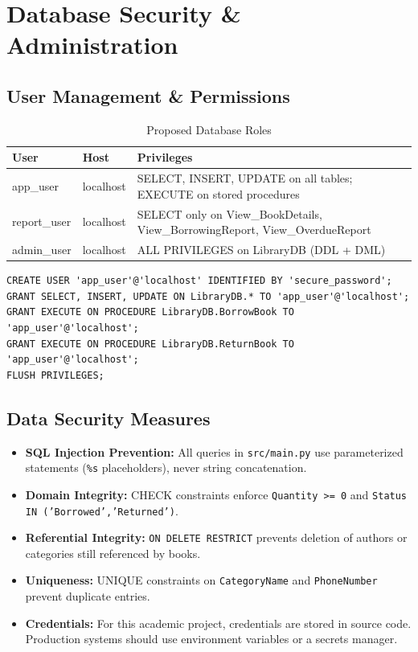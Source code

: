 \documentclass[12pt,a4paper,oneside]{report}
\begin{document}
\chapter{Database Security \& Administration}

\section{User Management \& Permissions}

\begin{table}[H]
  \centering
  \caption{Proposed Database Roles}
  \begin{tabularx}{\linewidth}{L{3cm} L{2.5cm} X}
    \toprule
    \textbf{User} & \textbf{Host} & \textbf{Privileges} \\
    \midrule
    app\_user    & localhost & SELECT, INSERT, UPDATE on all tables;
                               EXECUTE on stored procedures \\
    report\_user & localhost & SELECT only on View\_BookDetails,
                               View\_BorrowingReport, View\_OverdueReport \\
    admin\_user  & localhost & ALL PRIVILEGES on LibraryDB (DDL + DML) \\
    \bottomrule
  \end{tabularx}
\end{table}

\begin{lstlisting}[style=sqlstyle]
CREATE USER 'app_user'@'localhost' IDENTIFIED BY 'secure_password';
GRANT SELECT, INSERT, UPDATE ON LibraryDB.* TO 'app_user'@'localhost';
GRANT EXECUTE ON PROCEDURE LibraryDB.BorrowBook TO 'app_user'@'localhost';
GRANT EXECUTE ON PROCEDURE LibraryDB.ReturnBook TO 'app_user'@'localhost';
FLUSH PRIVILEGES;
\end{lstlisting}

\section{Data Security Measures}

\begin{itemize}
  \item \textbf{SQL Injection Prevention:} All queries in \texttt{src/main.py} use
        parameterized statements (\texttt{\%s} placeholders), never string concatenation.
  \item \textbf{Domain Integrity:} CHECK constraints enforce
        \texttt{Quantity >= 0} and \texttt{Status IN ('Borrowed','Returned')}.
  \item \textbf{Referential Integrity:} \texttt{ON DELETE RESTRICT} prevents deletion
        of authors or categories still referenced by books.
  \item \textbf{Uniqueness:} UNIQUE constraints on \texttt{CategoryName} and
        \texttt{PhoneNumber} prevent duplicate entries.
  \item \textbf{Credentials:} For this academic project, credentials are stored in
        source code. Production systems should use environment variables or a secrets
        manager.
\end{itemize}
\end{document}

